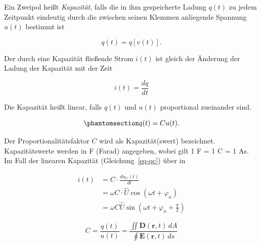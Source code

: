 \documentclass[
  ngerman,
  letterpaper,
]{scrbook}
\begin{document}
\begin{tcolorbox}[enhanced jigsaw, titlerule=0mm, rightrule=.15mm, toprule=.15mm, colback=white, toptitle=1mm, bottomrule=.15mm, coltitle=black, leftrule=.75mm, arc=.35mm, colbacktitle=quarto-callout-note-color!10!white, opacityback=0, bottomtitle=1mm, colframe=quarto-callout-note-color-frame, opacitybacktitle=0.6, breakable, title=\textcolor{quarto-callout-note-color}{\faInfo}\hspace{0.5em}{Kapazität \(C\) - Einheit: 1 F = 1 C/V = 1 As/V}, left=2mm]

Ein Zweipol heißt \emph{Kapazität}, falls die in ihm gespeicherte Ladung
\(q(t)\) zu jedem Zeitpunkt eindeutig durch die zwischen seinen Klemmen
anliegende Spannung \(u(t)\) bestimmt ist

\[
q(t) = q[v(t)].
\]

Der durch eine Kapazität fließende Strom \(i(t)\) ist gleich der
Änderung der Ladung der Kapazität mit der Zeit

\[
i(t) = \frac{dq}{dt}
\]

Die Kapazität heißt linear, falls \(q(t)\) und \(u(t)\) proportional
zueinander sind.

\begin{equation}\phantomsection\label{eq-qc}{
q(t) = C u(t).
}\end{equation}

Der Proportionalitätsfaktor \(C\) wird als Kapazität(swert) bezeichnet.
Kapazitätswerte werden in F (Farad) angegeben, wobei gilt 1 F = 1 C = 1
As. Im Fall der linearen Kapazität (Gleichung~\ref{eq-qc}) über in

\begin{align}
i(t) &= C \cdot \frac{du_C(t)}{dt} \\
&= \omega C \cdot \hat{U} \cos(\omega t + \varphi_u) \\
&= \omega C \hat{U} \sin(\omega t + \varphi_u + \frac{\pi}{2})
\end{align}

\[
C = \frac{q(t)}{u(t)} = \frac{\iint \mathbf{D}(\mathbf{r},t) \, dA}{\oint \mathbf{E}(\mathbf{r},t) \, ds}
\]

\end{tcolorbox}
\end{document}

